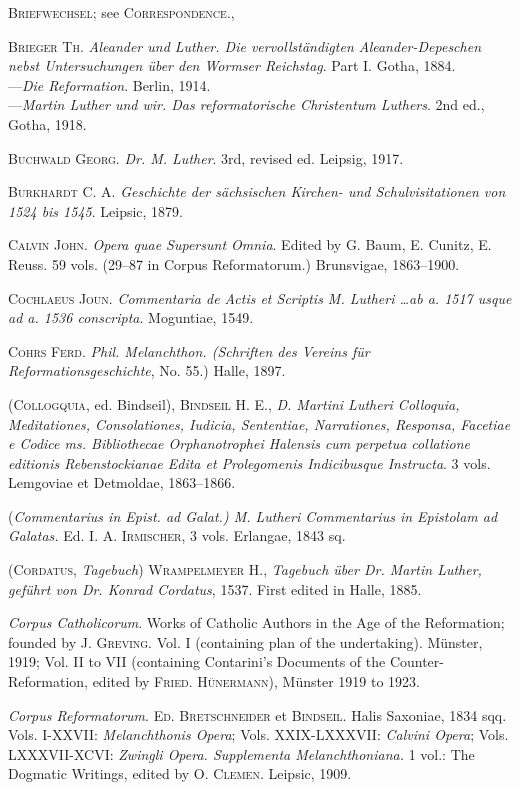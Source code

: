 \textsc{Briefwechsel}; see \textsc{Correspondence.},

\textsc{Brieger Th.} \textit{Aleander und Luther. Die vervollständigten Aleander-Depeschen
nebst Untersuchungen über den Wormser Reichstag}. Part I. Gotha, 1884. \\
---\textit{Die Reformation}. Berlin, 1914. \\
---\textit{Martin Luther und wir. Das reformatorische Christentum Luthers}. 2nd
ed., Gotha, 1918.

\textsc{Buchwald Georg.} \textit{Dr. M. Luther}. 3rd, revised ed. Leipsig, 1917.

\textsc{Burkhardt C. A.} \textit{Geschichte der sächsischen Kirchen- und Schulvisitationen
von 1524 bis 1545}. Leipsic, 1879.

\textsc{Calvin John.} \textit{Opera quae Supersunt Omnia}. Edited by G. Baum, E. Cunitz,
	E. Reuss. 59 vols. (29--87 in Corpus Reformatorum.) Brunsvigae, 1863--1900.

\textsc{Cochlaeus Joun.} \textit{Commentaria de Actis et Scriptis M. Lutheri \dots ab a.
1517 usque ad a. 1536 conscripta}. Moguntiae, 1549.

\textsc{Cohrs Ferd.} \textit{Phil. Melanchthon. (Schriften des Vereins für Reformationsgeschichte},
No. 55.) Halle, 1897.

(\textsc{Collogquia}, ed. Bindseil), \textsc{Bindseil H. E.}, \textit{D. Martini Lutheri Colloquia,
Meditationes, Consolationes, Iudicia, Sententiae, Narrationes, Responsa,
Facetiae e Codice ms. Bibliothecae Orphanotrophei Halensis cum perpetua
collatione editionis Rebenstockianae Edita et Prolegomenis Indicibusque
Instructa}. 3 vols. Lemgoviae et Detmoldae, 1863--1866.

(\textit{Commentarius in Epist. ad Galat.) M. Lutheri Commentarius in Epistolam
ad Galatas.} Ed. \textsc{I. A. Irmischer}, 3 vols. Erlangae, 1843 sq.

(\textsc{Cordatus}, \textit{Tagebuch}) \textsc{Wrampelmeyer H.}, \textit{Tagebuch über Dr. Martin
Luther, geführt von Dr. Konrad Cordatus}, 1537. First edited in Halle, 1885.

\textit{Corpus Catholicorum}. Works of Catholic Authors in the Age of the Reformation;
founded by \textsc{J. Greving.} Vol. I (containing plan of the undertaking).
Münster, 1919; Vol. II to VII (containing Contarini’s Documents
of the Counter-Reformation, edited by \textsc{Fried. Hünermann}), Münster
1919 to 1923.

\textit{Corpus Reformatorum}. \textsc{Ed. Bretschneider} et \textsc{Bindseil}. Halis Saxoniae, 1834
sqq. Vols. I-XXVII: \textit{Melanchthonis Opera}; Vols. XXIX-LXXXVII: \textit{Calvini
Opera}; Vols. LXXXVII-XCVI: \textit{Zwingli Opera. Supplementa Melanchthoniana.}
1 vol.: The Dogmatic Writings, edited by \textsc{O. Clemen.}
Leipsic, 1909.

